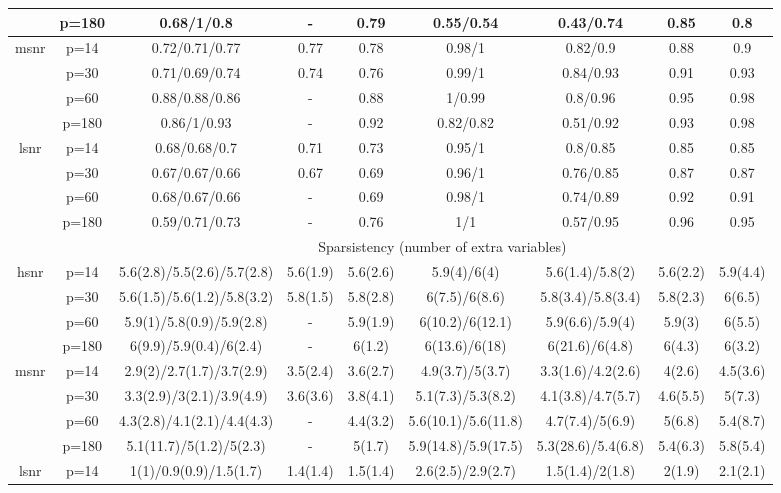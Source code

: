 \begin{table}[ht]
{\begin{tabular}{|c|c|ccccccc|}
   & p=180 & 0.68/1/0.8 & - & 0.79 & 0.55/0.54 & 0.43/0.74 & 0.85 & 0.8 \\ 
  \midrule\multirow{4}[2]{*}{msnr} & p=14 & 0.72/0.71/0.77 & 0.77 & 0.78 & 0.98/1 & 0.82/0.9 & 0.88 & 0.9 \\ 
   & p=30 & 0.71/0.69/0.74 & 0.74 & 0.76 & 0.99/1 & 0.84/0.93 & 0.91 & 0.93 \\ 
   & p=60 & 0.88/0.88/0.86 & - & 0.88 & 1/0.99 & 0.8/0.96 & 0.95 & 0.98 \\ 
   & p=180 & 0.86/1/0.93 & - & 0.92 & 0.82/0.82 & 0.51/0.92 & 0.93 & 0.98 \\ 
  \midrule\multirow{4}[2]{*}{lsnr} & p=14 & 0.68/0.68/0.7 & 0.71 & 0.73 & 0.95/1 & 0.8/0.85 & 0.85 & 0.85 \\ 
   & p=30 & 0.67/0.67/0.66 & 0.67 & 0.69 & 0.96/1 & 0.76/0.85 & 0.87 & 0.87 \\ 
   & p=60 & 0.68/0.67/0.66 & - & 0.69 & 0.98/1 & 0.74/0.89 & 0.92 & 0.91 \\ 
   & p=180 & 0.59/0.71/0.73 & - & 0.76 & 1/1 & 0.57/0.95 & 0.96 & 0.95 \\ 
   \midrule 
 \multicolumn{1}{|c}{} &       & \multicolumn{7}{c|}{Sparsistency (number of extra variables)} \\
\midrule\multirow{4}[2]{*}{hsnr} & p=14 & 5.6(2.8)/5.5(2.6)/5.7(2.8) & 5.6(1.9) & 5.6(2.6) & 5.9(4)/6(4) & 5.6(1.4)/5.8(2) & 5.6(2.2) & 5.9(4.4) \\ 
   & p=30 & 5.6(1.5)/5.6(1.2)/5.8(3.2) & 5.8(1.5) & 5.8(2.8) & 6(7.5)/6(8.6) & 5.8(3.4)/5.8(3.4) & 5.8(2.3) & 6(6.5) \\ 
   & p=60 & 5.9(1)/5.8(0.9)/5.9(2.8) & - & 5.9(1.9) & 6(10.2)/6(12.1) & 5.9(6.6)/5.9(4) & 5.9(3) & 6(5.5) \\ 
   & p=180 & 6(9.9)/5.9(0.4)/6(2.4) & - & 6(1.2) & 6(13.6)/6(18) & 6(21.6)/6(4.8) & 6(4.3) & 6(3.2) \\ 
  \midrule\multirow{4}[2]{*}{msnr} & p=14 & 2.9(2)/2.7(1.7)/3.7(2.9) & 3.5(2.4) & 3.6(2.7) & 4.9(3.7)/5(3.7) & 3.3(1.6)/4.2(2.6) & 4(2.6) & 4.5(3.6) \\ 
   & p=30 & 3.3(2.9)/3(2.1)/3.9(4.9) & 3.6(3.6) & 3.8(4.1) & 5.1(7.3)/5.3(8.2) & 4.1(3.8)/4.7(5.7) & 4.6(5.5) & 5(7.3) \\ 
   & p=60 & 4.3(2.8)/4.1(2.1)/4.4(4.3) & - & 4.4(3.2) & 5.6(10.1)/5.6(11.8) & 4.7(7.4)/5(6.9) & 5(6.8) & 5.4(8.7) \\ 
   & p=180 & 5.1(11.7)/5(1.2)/5(2.3) & - & 5(1.7) & 5.9(14.8)/5.9(17.5) & 5.3(28.6)/5.4(6.8) & 5.4(6.3) & 5.8(5.4) \\ 
  \midrule\multirow{4}[2]{*}{lsnr} & p=14 & 1(1)/0.9(0.9)/1.5(1.7) & 1.4(1.4) & 1.5(1.4) & 2.6(2.5)/2.9(2.7) & 1.5(1.4)/2(1.8) & 2(1.9) & 2.1(2.1) \\ 

\end{tabular}}
\end{table}

